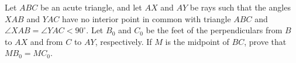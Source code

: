 Let $ABC$ be an acute triangle, and let $AX$ and $AY$ be rays such that the angles $XAB$ and $YAC$ have no interior point in common with triangle $ABC$ and $\angle XAB=\angle YAC<90^\circ$. Let $B_0$ and $C_0$ be the feet of the perpendiculars from $B$ to $AX$ and from $C$ to $AY$, respectively. If $M$ is the midpoint of $BC$, prove that $MB_0=MC_0$.
